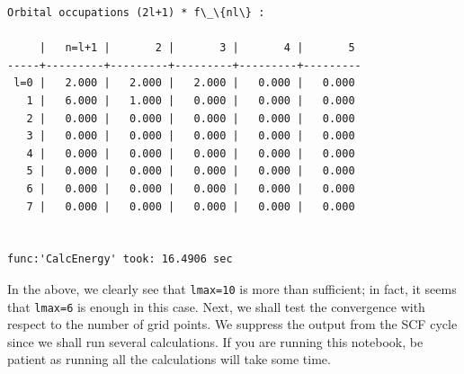 \documentclass[9pt]{article}
\begin{document}
\begin{Verbatim}[commandchars=\\\{\}]
Orbital occupations (2l+1) * f\_\{nl\} :

     |   n=l+1 |       2 |       3 |       4 |       5
-----+---------+---------+---------+---------+---------
 l=0 |   2.000 |   2.000 |   2.000 |   0.000 |   0.000
   1 |   6.000 |   1.000 |   0.000 |   0.000 |   0.000
   2 |   0.000 |   0.000 |   0.000 |   0.000 |   0.000
   3 |   0.000 |   0.000 |   0.000 |   0.000 |   0.000
   4 |   0.000 |   0.000 |   0.000 |   0.000 |   0.000
   5 |   0.000 |   0.000 |   0.000 |   0.000 |   0.000
   6 |   0.000 |   0.000 |   0.000 |   0.000 |   0.000
   7 |   0.000 |   0.000 |   0.000 |   0.000 |   0.000


func:'CalcEnergy' took: 16.4906 sec
    \end{Verbatim}

    In the above, we clearly see that \texttt{lmax=10} is more than
sufficient; in fact, it seems that \texttt{lmax=6} is enough in this
case. Next, we shall test the convergence with respect to the number of
grid points. We suppress the output from the SCF cycle since we shall
run several calculations. If you are running this notebook, be patient
as running all the calculations will take some time.
\end{document}
